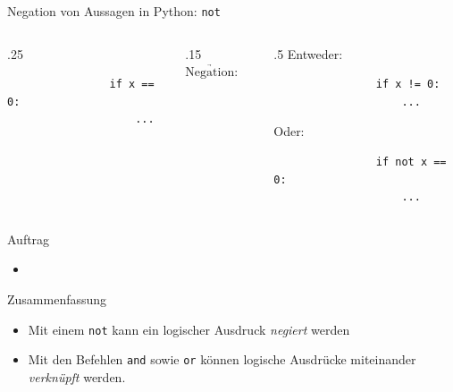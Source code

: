 \begin{frame}[fragile]{Negation von Aussagen in Python: \lstinline|not|}
    \begin{columns}
        \begin{column}{.25\textwidth}
            \begin{lstlisting}
                if x == 0:
                    ...
            \end{lstlisting}
        \end{column}
        \begin{column}{.15\textwidth}
            $\underrightarrow{\text{Negation:}}$
        \end{column}
        \begin{column}{.5\textwidth}
            Entweder:
            \begin{lstlisting}
                if x != 0:
                    ...
            \end{lstlisting}

            Oder:
            \begin{lstlisting}
                if not x == 0:
                    ...
            \end{lstlisting}
        \end{column}
    \end{columns}
\end{frame}

\begin{frame}[fragile]{Auftrag}
    \begin{itemize}
        \item {}
    \end{itemize}
\end{frame}

\begin{frame}[fragile]{Zusammenfassung}
    \begin{itemize}
        \item Mit einem \lstinline|not| kann ein logischer Ausdruck \textit{negiert} werden
        \item Mit den Befehlen \lstinline|and| sowie \lstinline|or| können logische Ausdrücke miteinander \textit{verknüpft} werden.
    \end{itemize}
\end{frame}